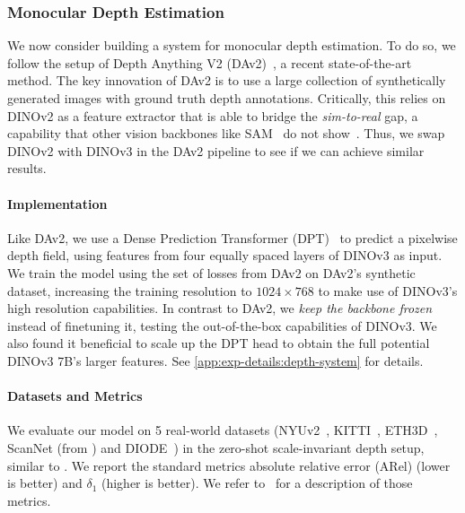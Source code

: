 \subsubsection{Monocular Depth Estimation}
\label{sec:results-depth-estimation}

We now consider building a system for monocular depth estimation.
To do so, we follow the setup of Depth Anything V2 (DAv2)~\citep{yang2024depthanythingv2}, a recent state-of-the-art method.
The key innovation of DAv2 is to use a large collection of synthetically generated images with ground truth depth annotations.
Critically, this relies on DINOv2 as a feature extractor that is able to bridge the \emph{sim-to-real} gap, a capability that other vision backbones like SAM~\citep{kirillov2023segment} do not show~\citep{yang2024depthanythingv2}.
Thus, we swap DINOv2 with DINOv3 in the DAv2 pipeline to see if we can achieve similar results.

\paragraph{Implementation}
Like DAv2, we use a Dense Prediction Transformer (DPT)~\citep{ranftl2021vision} to predict a pixelwise depth field, using features from four equally spaced layers of DINOv3 as input.
We train the model using the set of losses from DAv2 on DAv2's synthetic dataset, increasing the training resolution to $1024 \times 768$ to make use of DINOv3's high resolution capabilities.
In contrast to DAv2, we \emph{keep the backbone frozen} instead of finetuning it, testing the out-of-the-box capabilities of DINOv3.
We also found it beneficial to scale up the DPT head to obtain the full potential DINOv3 7B's larger features.
See \cref{app:exp-details:depth-system} for details.

\paragraph{Datasets and Metrics}
We evaluate our model on 5 real-world datasets (NYUv2~\citep{silberman2012indoor}, KITTI~\citep{geiger2013vision}, ETH3D~\citep{schoeps2017multiview}, ScanNet (from \citet{ke2025marigold}) and DIODE~\citep{vasiljevic2019diode}) in the zero-shot scale-invariant depth setup, similar to \citet{ranftl2020towards,ke2025marigold,yang2024depthanythingv2}.
We report the standard metrics absolute relative error (ARel) (lower is better) and $\delta_1$ (higher is better).
We refer to~\citet{yang2024depthanythingv1} for a description of those metrics.


